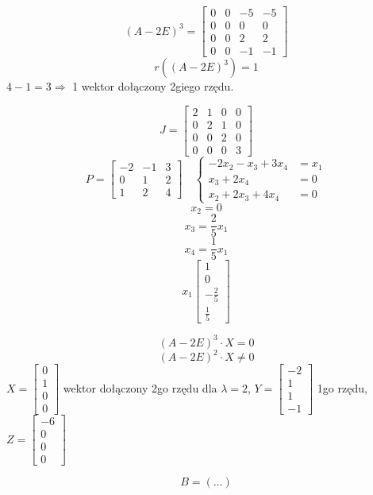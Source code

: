 \documentclass[a4paper,fleqn]{article}
\begin{document}
	\[ (A-2E)^3 =
		\begin{bmatrix}
			0 & 0 & -5 & -5\\
			0 & 0 & 0 & 0\\
			0 & 0 & 2 & 2\\
			0 & 0 & -1 & -1
		\end{bmatrix}
	\]
	\[ r((A-2E)^3) = 1 \]
	$4-1 = 3 \Rightarrow $ 1 wektor dołączony 2giego rzędu.

	\[ J =
		\begin{bmatrix}
			2 & 1 & 0 & 0\\
			0 & 2 & 1 & 0 \\
			0 & 0 & 2 & 0 \\
			0 & 0 & 0 & 3
		\end{bmatrix}
	\]
	\[ P =
		\begin{bmatrix}
			-2 & -1 & 3 \\
			0  & 1  & 2 \\
			1  & 2  & 4
		\end{bmatrix}
		\quad
		\begin{cases}
			-2x_2 - x_3 + 3x_4 &= x_1 \\
			x_3 + 2x_4 &= 0 \\
			x_2 + 2x_3 + 4x_4 &= 0
		\end{cases}
	\]
	\[ x_2 = 0 \]
	\[ x_3 = \frac 2 5 x_1 \]
	\[ x_4 = \frac 1 5 x_1 \]
	\[ x_1 \begin{bmatrix} 1 \\ 0 \\ -\frac 2 5 \\ \frac 1 5 \end{bmatrix} \]

	\[ (A-2E)^3 \cdot X = 0 \]
	\[ (A-2E)^2 \cdot X \neq 0 \]
	$ X = \begin{bmatrix} 0\\1\\0\\0\end{bmatrix} $ wektor dołączony 2go rzędu
	dla $\lambda = 2$, $Y = \begin{bmatrix}-2\\1\\1\\-1\end{bmatrix} $ 1go rzędu,
	$ Z = \begin{bmatrix}-6\\0\\0\\0\end{bmatrix} $

	\[ B = ( \ldots ) \]
\end{document}
